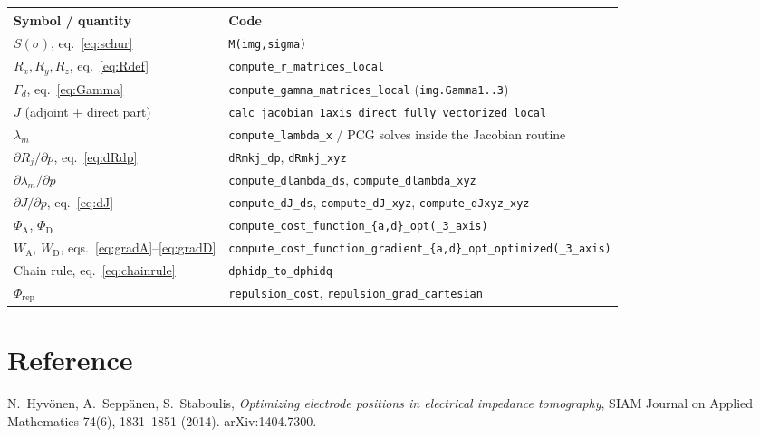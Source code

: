 \documentclass[11pt,a4paper]{article}
\newcommand{\code}[1]{\texttt{#1}}
\begin{document}
\begin{center}
\begin{tabular}{ll}
\hline
Symbol / quantity & Code \\
\hline
$S(\sigma)$, eq.~\eqref{eq:schur} & \code{M(img,sigma)} \\
$R_x,R_y,R_z$, eq.~\eqref{eq:Rdef} & \code{compute\_r\_matrices\_local} \\
$\Gamma_d$, eq.~\eqref{eq:Gamma} & \code{compute\_gamma\_matrices\_local} (\code{img.Gamma1..3}) \\
$J$ (adjoint + direct part) & \code{calc\_jacobian\_1axis\_direct\_fully\_vectorized\_local} \\
$\lambda_m$ & \code{compute\_lambda\_x} / PCG solves inside the Jacobian routine \\
$\partial R_j / \partial p$, eq.~\eqref{eq:dRdp} & \code{dRmkj\_dp}, \code{dRmkj\_xyz} \\
$\partial \lambda_m / \partial p$ & \code{compute\_dlambda\_ds}, \code{compute\_dlambda\_xyz} \\
$\partial J / \partial p$, eq.~\eqref{eq:dJ} & \code{compute\_dJ\_ds}, \code{compute\_dJ\_xyz}, \code{compute\_dJxyz\_xyz} \\
$\Phi_{\mathrm{A}}$, $\Phi_{\mathrm{D}}$ & \code{compute\_cost\_function\_\{a,d\}\_opt(\_3\_axis)} \\
$W_{\mathrm{A}}$, $W_{\mathrm{D}}$, eqs.~\eqref{eq:gradA}--\eqref{eq:gradD} &
  \code{compute\_cost\_function\_gradient\_\{a,d\}\_opt\_optimized(\_3\_axis)} \\
Chain rule, eq.~\eqref{eq:chainrule} & \code{dphidp\_to\_dphidq} \\
$\Phi_{\mathrm{rep}}$ & \code{repulsion\_cost}, \code{repulsion\_grad\_cartesian} \\
\hline
\end{tabular}
\end{center}

\section*{Reference}

N.~Hyv\"onen, A.~Sepp\"anen, S.~Staboulis,
\emph{Optimizing electrode positions in electrical impedance tomography},
SIAM Journal on Applied Mathematics 74(6), 1831--1851 (2014). arXiv:1404.7300.
\end{document}
